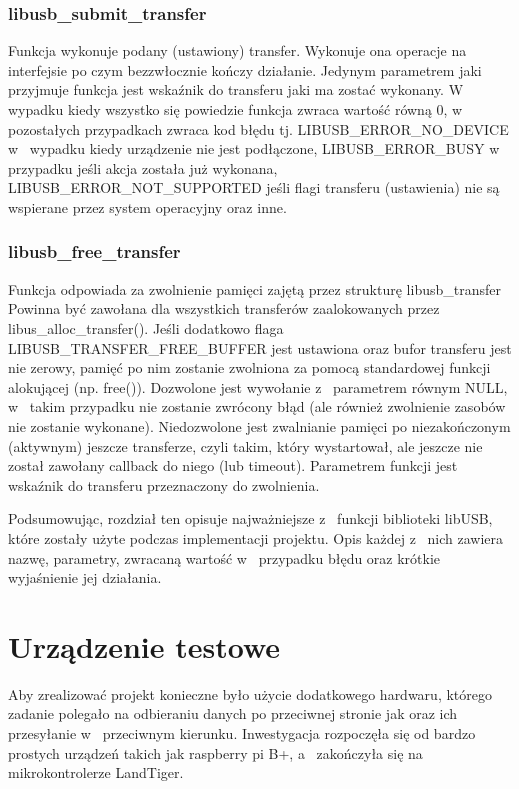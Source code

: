 \documentclass{BscUS}
\newcommand\blankpage{%
    \null
    \thispagestyle{empty}%
    \newpage}
\begin{document}
\subsection{libusb\_submit\_transfer}
\indent Funkcja wykonuje podany (ustawiony) transfer.
Wykonuje ona operacje na interfejsie po czym bezzwłocznie kończy działanie.
Jedynym parametrem jaki przyjmuje funkcja jest wskaźnik do transferu jaki ma zostać wykonany.
\newline
W wypadku kiedy wszystko się powiedzie funkcja zwraca wartość równą 0, w~ pozostałych przypadkach zwraca kod błędu tj. LIBUSB\_ERROR\_NO\_DEVICE w~ wypadku kiedy urządzenie nie jest podłączone, LIBUSB\_ERROR\_BUSY w~ przypadku jeśli akcja została już wykonana, LIBUSB\_ERROR\_NOT\_SUPPORTED jeśli flagi transferu (ustawienia) nie są wspierane przez system operacyjny oraz inne.
\subsection{libusb\_free\_transfer}
\indent Funkcja odpowiada za zwolnienie pamięci zajętą przez strukturę libusb\_transfer
Powinna być zawołana dla wszystkich transferów zaalokowanych przez libus\_alloc\_transfer().
Jeśli dodatkowo flaga LIBUSB\_TRANSFER\_FREE\_BUFFER jest ustawiona oraz bufor transferu jest nie zerowy, pamięć po nim zostanie zwolniona za pomocą standardowej funkcji alokującej (np. free()).
Dozwolone jest wywołanie z~ parametrem równym NULL, w~ takim przypadku nie zostanie zwrócony błąd (ale również zwolnienie zasobów nie zostanie wykonane).
Niedozwolone jest zwalnianie pamięci po niezakończonym (aktywnym) jeszcze transferze, czyli takim, który wystartował, ale jeszcze nie został zawołany callback do niego (lub timeout).
Parametrem funkcji jest wskaźnik do transferu przeznaczony do zwolnienia.
\newline

\indent Podsumowując, rozdział ten opisuje najważniejsze z~ funkcji biblioteki libUSB, które zostały użyte podczas implementacji projektu. Opis każdej z~ nich zawiera nazwę, parametry, zwracaną wartość w~ przypadku błędu oraz krótkie wyjaśnienie jej działania.
\afterpage{\blankpage}
\chapter{Urządzenie testowe}
\label{microcontrollerChapter}
Aby zrealizować projekt konieczne było użycie dodatkowego hardwaru, którego zadanie polegało na odbieraniu danych po przeciwnej stronie jak oraz ich przesyłanie w~ przeciwnym kierunku. Inwestygacja rozpoczęła się od bardzo prostych urządzeń takich jak raspberry pi B+, a~ zakończyła się na mikrokontrolerze LandTiger.
\end{document}
